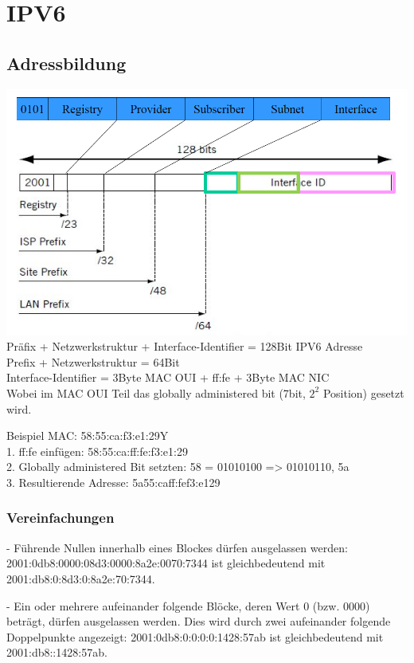 \section{IPV6}
\subsection{Adressbildung}
\includegraphics[scale=0.5]{media/ipv6.png}
Präfix + Netzwerkstruktur + Interface-Identifier = 128Bit IPV6 Adresse\\
Prefix + Netzwerkstruktur = 64Bit\\
Interface-Identifier = 3Byte MAC OUI + ff:fe + 3Byte MAC NIC\\
Wobei im MAC OUI Teil das globally administered bit (7bit, $2^{2}$ Position) gesetzt wird.

Beispiel MAC: 58:55:ca:f3:e1:29Y\\
1. ff:fe einfügen: 58:55:ca:ff:fe:f3:e1:29\\
2. Globally administered Bit setzten: 58 = 01010100 => 01010110, 5a\\
3. Resultierende Adresse: 5a55:caff:fef3:e129

\subsubsection*{Vereinfachungen}

- Führende Nullen innerhalb eines Blockes dürfen ausgelassen werden: 2001:0db8:0000:08d3:0000:8a2e:0070:7344 ist gleichbedeutend mit 2001:db8:0:8d3:0:8a2e:70:7344.

- Ein oder mehrere aufeinander folgende Blöcke, deren Wert 0 (bzw. 0000) beträgt, dürfen ausgelassen werden. Dies wird durch zwei aufeinander folgende Doppelpunkte angezeigt: 2001:0db8:0:0:0:0:1428:57ab ist gleichbedeutend mit 2001:db8::1428:57ab.

